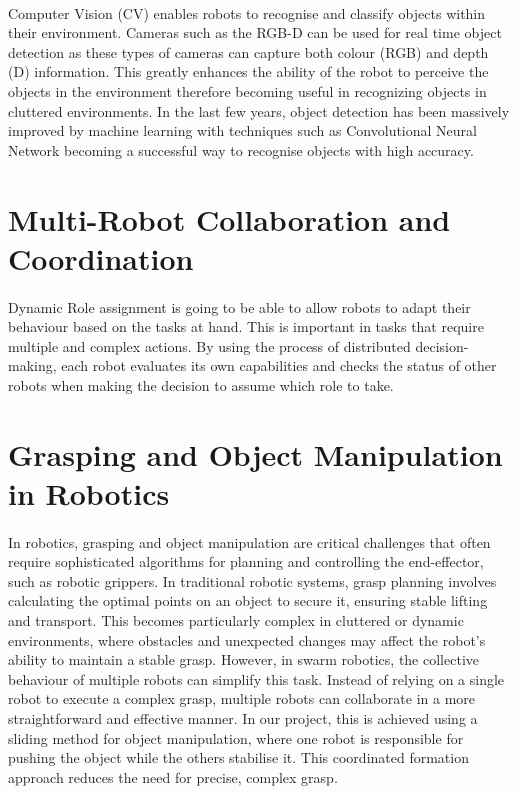 \paragraph*{}
Computer Vision (CV) enables robots to recognise and classify objects within their environment. Cameras such as the RGB-D can be used for real time object detection as these types of cameras can capture both colour (RGB) and depth (D) information. This greatly enhances the ability of the robot to perceive the objects in the environment therefore becoming useful in recognizing objects in cluttered environments. In the last few years, object detection has been massively improved by machine learning with techniques such as Convolutional Neural Network becoming a successful way to recognise objects with high accuracy\cite{redmon2018yolov3}. 

\section{Multi-Robot Collaboration and Coordination}

\paragraph*{}
Dynamic Role assignment is going to be able to allow robots to adapt their behaviour based on the tasks at hand. This is important in tasks that require multiple and complex actions. By using the process of distributed decision-making, each robot evaluates its own capabilities and checks the status of other robots when making the decision to assume which role to take\cite{parker1998alliance}.

\section{Grasping and Object Manipulation in Robotics}

\paragraph*{}
In robotics, grasping and object manipulation are critical challenges that often require sophisticated algorithms for planning and controlling the end-effector, such as robotic grippers. In traditional robotic systems, grasp planning involves calculating the optimal points on an object to secure it, ensuring stable lifting and transport. This becomes particularly complex in cluttered or dynamic environments, where obstacles and unexpected changes may affect the robot’s ability to maintain a stable grasp. However, in swarm robotics, the collective behaviour of multiple robots can simplify this task. Instead of relying on a single robot to execute a complex grasp, multiple robots can collaborate in a more straightforward and effective manner. In our project, this is achieved using a sliding method for object manipulation, where one robot is responsible for pushing the object while the others stabilise it. This coordinated formation approach reduces the need for precise, complex grasp.

